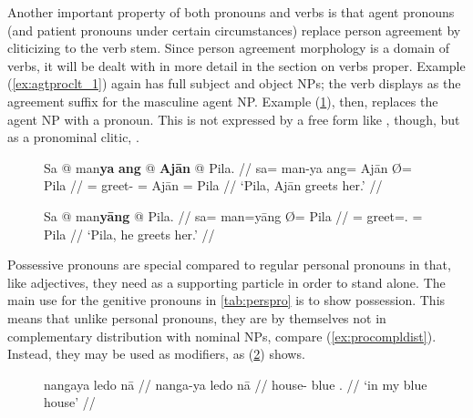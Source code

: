 Another important property of both pronouns and verbs is that agent pronouns
(and patient pronouns under certain circumstances) replace person agreement by
cliticizing to the verb stem. Since person agreement morphology is a domain of
verbs, it will be dealt with in more detail in the section on verbs proper. 
Example (\ref{ex:agtproclt_1}) again has full subject and object NPs; the verb
displays  as the agreement suffix for the masculine agent NP.
Example (\ref{ex:agtproclt_2}), then, replaces the agent NP with a pronoun.
This is not expressed by a free form like , though, but as a pronominal
clitic, .

\begin{figure}[h]
\pex\label{ex:agtproclt}
\a\label{ex:agtproclt_1}%
\begingl
	\gla Sa @ man\textbf{ya} \textbf{ang} @ \textbf{Ajān} {} @ Pila. //
	\glb sa= man-ya ang= ​Ajān Ø= ​Pila //
	\glc \PatT{}= greet-\TsgM{} \Aarg{}= ​Ajān \Top{}= ​Pila //
	\glft `Pila, Ajān greets her.' //
\endgl

\a\label{ex:agtproclt_2}%
\begingl
	\gla Sa @ man\textbf{yāng} {} @ Pila. //
	\glb sa= man=yāng Ø= ​Pila //
	\glc \PatT{}= greet=\TsgM{}.\Aarg{} \Top{}= Pila //
	\glft `Pila, he greets her.' //
\endgl
\xe
\end{figure}


\label{phsec:possadj}
Possessive pronouns are special compared to regular personal pronouns in that,
like adjectives, they need  as a supporting particle in order to
stand alone. The main use for the genitive pronouns in \autoref{tab:perspro} is
to show possession. This means that unlike personal pronouns, they are by
themselves not in complementary distribution with nominal NPs, compare
(\ref{ex:procompldist}). Instead, they may be used as modifiers, as
(\ref{ex:adjgen}) shows.

\begin{figure}[h]
\ex\label{ex:adjgen}%
\begingl
	\gla nangaya ledo nā //
	\glb nanga-ya ledo nā //
	\glc house-\Loc{} blue \Fsg{}.\Gen{} //
	\glft `in my blue house' //
\endgl
\xe
\end{figure}

